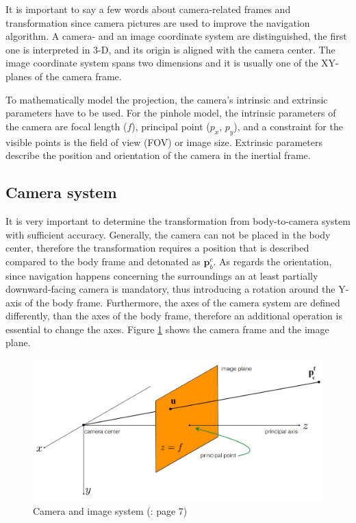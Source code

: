 It is important to say a few words about camera-related frames and transformation since camera pictures are used to improve the navigation algorithm. A camera- and an image coordinate system are distinguished, the first one is interpreted in 3-D, and its origin is aligned with the camera center. The image coordinate system spans two dimensions and it is usually one of the XY-planes of the camera frame. 

To mathematically model the projection, the camera's intrinsic and extrinsic parameters have to be used. For the pinhole model, the intrinsic parameters of the camera are focal length ($f$), principal point ($p_x$, $p_y$), and a constraint for the visible points is the field of view (FOV) or image size. Extrinsic parameters describe the position and orientation of the camera in the inertial frame.

\subsection{Camera system}

It is very important to determine the transformation from body-to-camera system with sufficient accuracy. Generally, the camera can not be placed in the body center, therefore the transformation requires a position that is described compared to the body frame and detonated as $\mathbf{p}_{b}^c$. As regards the orientation, since navigation happens concerning the surroundings an at least partially downward-facing camera is mandatory, thus introducing a rotation around the Y-axis of the body frame. Furthermore, the axes of the camera system are defined differently, than the axes of the body frame, therefore an additional operation is essential to change the axes. Figure \ref{fig:camera-system} shows the camera frame and the image plane. 

\begin{figure}[!ht]
    \centering
    \includegraphics[width=\textwidth]{figures/camera.png}
    \caption{Camera and image system (\cite{camera-matrix-slide}: page 7)}
    \label{fig:camera-system}
\end{figure}

